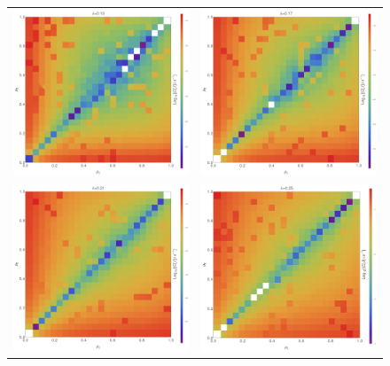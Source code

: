 \begin{figure}
\begin{center}
\begin{tabular}{c c}
\includegraphics[width=0.49\linewidth]{numerics/images/concFrames/concDataCurr0p13.png} & 
\includegraphics[width=0.49\linewidth]{numerics/images/concFrames/concDataCurr0p17.png} \\
\includegraphics[width=0.49\linewidth]{numerics/images/concFrames/concDataCurr0p21.png} &
\includegraphics[width=0.49\linewidth]{numerics/images/concFrames/concDataCurr0p25.png} \\
\end{tabular}
\end{center}
\end{figure}
